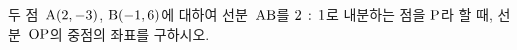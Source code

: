 두 점~$\mathrm{A}(2{,}\mkern3mu\mathopen{}-3)$, $\mathrm{B}(-1{,}\mkern3mu\mathopen{}6)$에 대하여 선분~$\mathrm{AB}$를 $2\mkern3mu :\mkern3mu 1$로 내분하는 점을 $\mathrm{P}$라 할 때, 선분~$\mathrm{OP}$의 중점의 좌표를 구하시오. 
